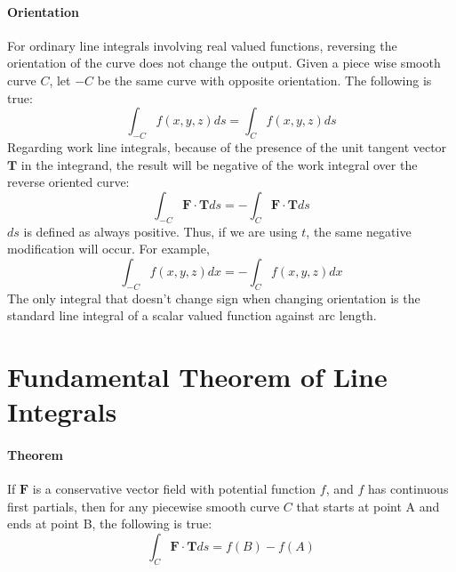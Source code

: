 \documentclass{article}
\begin{document}
\paragraph{Orientation} For ordinary line integrals involving real valued functions, reversing the orientation of the curve does not change the output. Given a piece wise smooth curve $C$, let $-C$ be the same curve with opposite orientation. The following is true:
\[ \int_{-C} f(x,y,z) ds = \int_C f(x,y,z) ds \]
Regarding work line integrals, because of the presence of the unit tangent vector $\mathbf{T}$ in the integrand, the result will be negative of the work integral over the reverse oriented curve:
\[ \int_{-C} \mathbf{F\cdot T}ds = - \int_C \mathbf{F \cdot T}ds \]
$ds$ is defined as always positive. Thus, if we are using $t$, the same negative modification will occur. For example,
\[ \int_{-C} f(x,y,z)dx = -\int_C f(x,y,z)dx \]
The only integral that doesn't change sign when changing orientation is the standard line integral of a scalar valued function against arc length.

\newpage

\section*{Fundamental Theorem of Line Integrals}
\paragraph{Theorem} If $\mathbf{F}$ is a conservative vector field with potential function $f$, and $f$ has continuous first partials, then for any piecewise smooth curve $C$ that starts at point A and ends at point B, the following is true:
\[ \int_C \mathbf{F\cdot T}ds = f(B)-f(A) \]
\end{document}
